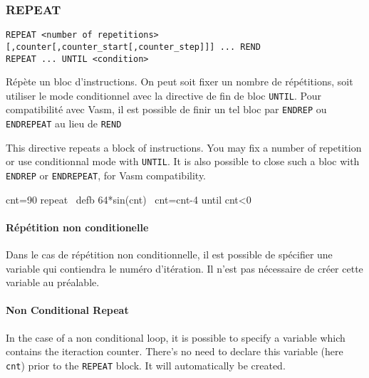 \subsubsection{REPEAT}

\begin{verbatim}
REPEAT <number of repetitions>[,counter[,counter_start[,counter_step]]] ... REND
REPEAT ... UNTIL <condition>
\end{verbatim}

\begin{xfr}
Répète un bloc d'instructions.
On peut soit fixer un nombre de répétitions, soit utiliser le mode conditionnel avec la directive de fin de bloc \texttt{UNTIL}. Pour compatibilité avec Vasm, il est possible de finir un tel bloc par \texttt{ENDREP} ou \texttt{ENDREPEAT} au lieu de \texttt{REND}
\end{xfr}

\begin{xen}
This directive repeats a block of instructions. You may fix a number of repetition or use conditionnal mode with \texttt{UNTIL}. It is also possible to close such a bloc with \texttt{ENDREP} or \texttt{ENDREPEAT}, for Vasm compatibility.
\end{xen}

\begin{code}
cnt=90
repeat
\    defb 64*sin(cnt)
\    cnt=cnt-4
until cnt\textless 0
\end{code}


\begin{xfr}
\paragraph{Répétition non conditionelle}
Dans le cas de répétition non conditionnelle, il est possible de spécifier une variable qui contiendra le numéro d'itération.
Il n'est pas nécessaire de créer cette variable au préalable.
\end{xfr}

\begin{xen}
\paragraph{Non Conditional Repeat}
In the case of a non conditional loop, it is possible to specify a variable which contains the iteraction counter.
There's no need to declare this variable (here \texttt{cnt}) prior to the \texttt{REPEAT} block. It will automatically be created.
\end{xen}

